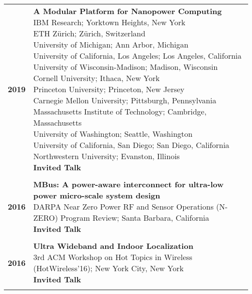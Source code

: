 \documentclass{article}
\begin{document}
\begin{longtable}{>{\bf}p{1cm} l}
  \\

  2019 & \makecell{
    \textbf{A Modular Platform for Nanopower Computing} \\
    IBM Research; Yorktown Heights, New York \\
    ETH Z\"urich; Z\"urich, Switzerland \\
    University of Michigan; Ann Arbor, Michigan \\
    University of California, Los Angeles; Los Angeles, California \\
    University of Wisconsin-Madison; Madison, Wisconsin \\
    Cornell University; Ithaca, New York \\
    Princeton University; Princeton, New Jersey \\
    Carnegie Mellon University; Pittsburgh, Pennsylvania \\
    Massachusetts Institute of Technology; Cambridge, Massachusetts \\
    University of Washington; Seattle, Washington \\
    University of California, San Diego; San Diego, California \\
    Northwestern University; Evanston, Illinois \\
    \textbf{\color{BrickRed} Invited Talk} \\
  } \\

  \\

  2016 & \makecell {
    \textbf{MBus: A power-aware interconnect for ultra-low power micro-scale system design} \\
    DARPA Near Zero Power RF and Sensor Operations (N-ZERO) Program Review; Santa Barbara, California \\
    \textbf{\color{BrickRed} Invited Talk} \\
  } \\

  \\

  2016 & \makecell{
    \textbf{Ultra Wideband and Indoor Localization} \\
    3rd ACM Workshop on Hot Topics in Wireless (HotWireless'16); New York City, New York \\
    \textbf{\color{BrickRed} Invited Talk}
  } \\

  \\


\end{longtable}
\end{document}
